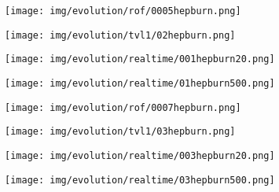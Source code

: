 \begin{figure}[ht]
    \centering
    \begin{center}
        \begin{subfigure}[b]{0.21\textwidth}
            \texttt{[image: img/evolution/rof/0005hepburn.png]}
        \end{subfigure}
        \begin{subfigure}[b]{0.21\textwidth}
            \texttt{[image: img/evolution/tvl1/02hepburn.png]}
        \end{subfigure}
        \begin{subfigure}[b]{0.21\textwidth}
            \texttt{[image: img/evolution/realtime/001hepburn20.png]}
        \end{subfigure}
        \begin{subfigure}[b]{0.21\textwidth}
            \texttt{[image: img/evolution/realtime/01hepburn500.png]}
        \end{subfigure}
    \end{center}
    \begin{center}
        \begin{subfigure}[b]{0.21\textwidth}
            \texttt{[image: img/evolution/rof/0007hepburn.png]}
        \end{subfigure}
        \begin{subfigure}[b]{0.21\textwidth}
            \texttt{[image: img/evolution/tvl1/03hepburn.png]}
        \end{subfigure}
        \begin{subfigure}[b]{0.21\textwidth}
            \texttt{[image: img/evolution/realtime/003hepburn20.png]}
        \end{subfigure}
        \begin{subfigure}[b]{0.21\textwidth}
            \texttt{[image: img/evolution/realtime/03hepburn500.png]}
        \end{subfigure}
    \end{center}
    \begin{center}

\end{center}
\end{figure}
